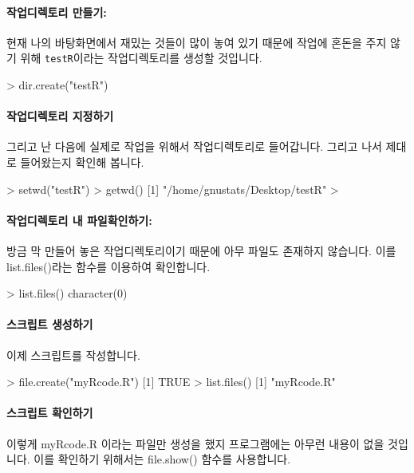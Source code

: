 \paragraph{작업디렉토리 만들기:}
현재 나의 바탕화면에서 재밌는 것들이 많이 놓여 있기 때문에 작업에 혼돈을 주지 않기 위해 \texttt{testR}이라는 작업디렉토리를 생성할 것입니다. 
\begin{Schunk}
\begin{Soutput}
> dir.create("testR")
\end{Soutput}
\end{Schunk}

\paragraph{작업디렉토리 지정하기}
그리고 난 다음에 실제로 작업을 위해서 작업디렉토리로 들어갑니다. 
그리고 나서 제대로 들어왔는지 확인해 봅니다. 

\begin{Schunk}
\begin{Soutput}
> setwd("testR")
> getwd()
[1] "/home/gnustats/Desktop/testR"
>
\end{Soutput}
\end{Schunk}

\paragraph{작업디렉토리 내 파일확인하기:}
방금 막 만들어 놓은 작업디렉토리이기 때문에 아무 파일도 존재하지 않습니다. 
이를 list.files()라는 함수를 이용하여 확인합니다. 

\begin{Schunk}
\begin{Soutput}
> list.files()
character(0)
\end{Soutput}
\end{Schunk}

\paragraph{스크립트 생성하기}
이제 스크립트를 작성합니다. 
\begin{Schunk}
\begin{Soutput}
> file.create("myRcode.R")
[1] TRUE
> list.files()
[1] "myRcode.R"
\end{Soutput}
\end{Schunk}

\paragraph{스크립트 확인하기}
이렇게 myRcode.R 이라는 파일만 생성을 했지 프로그램에는 아무런 내용이 없을 것입니다. 
이를 확인하기 위해서는 file.show() 함수를 사용합니다. 

